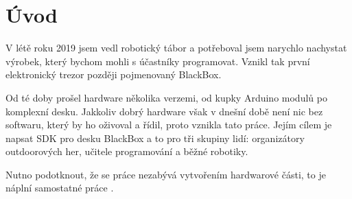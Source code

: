 \chapter*{Úvod}

V létě roku 2019 jsem vedl robotický tábor a potřeboval jsem narychlo nachystat výrobek, který bychom mohli s účastníky programovat.
Vznikl tak první elektronický trezor později pojmenovaný BlackBox.

Od té doby prošel hardware několika verzemi, od kupky Arduino modulů po komplexní desku.
Jakkoliv dobrý hardware však v dnešní době není nic bez softwaru, který by ho oživoval a řídil, proto vznikla tato práce.
Jejím cílem je napsat SDK pro desku BlackBox a to pro tři skupiny lidí: organizátory outdoorových her, učitele programování a běžné robotiky.

Nutno podotknout, že se práce nezabývá vytvořením hardwarové části, to je náplní samostatné práce \cite{BlackBox_hardware}.


